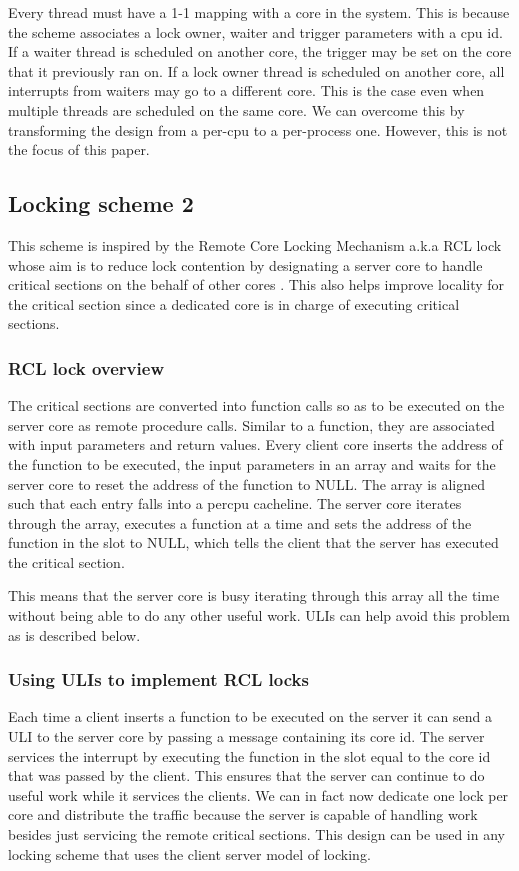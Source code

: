 Every thread must have a 1-1 mapping with a core in the system. This is because
the scheme associates a lock owner, waiter and trigger parameters with a cpu id.
If a waiter thread is scheduled on another core, the trigger may be set on the
core that it previously ran on. If a lock owner thread is scheduled on another
core, all interrupts from waiters may go to a different core. This is the case
even when multiple threads are scheduled on the same core. We can overcome this
by transforming the design from a per-cpu to a per-process one. However, this is
not the focus of this paper.

\subsection{Locking scheme 2}

This scheme is inspired by the Remote Core Locking Mechanism a.k.a RCL lock
whose aim is to reduce lock contention by designating a server core to handle
critical sections on the behalf of other cores \cite{lozi}. This also helps improve locality
for the critical section since a dedicated core is in charge of executing
critical sections. 

\subsubsection{RCL lock overview}

The critical sections are converted into function calls so as to be executed on
the server core as remote procedure calls. Similar to a function, they are
associated with input parameters and return values. Every client core inserts
the address of the function to be executed, the input parameters in an array and
waits for the server core to reset the address of the function to NULL. The
array is aligned such that each entry falls into a percpu cacheline. The server
core iterates through the array, executes a function at a time and sets the
address of the function in the slot to NULL, which tells the client that the
server has executed the critical section.

This means that the server core is busy iterating through this array all the
time without being able to do any other useful work. ULIs can help avoid this
problem as is described below.

\subsubsection{Using ULIs to implement RCL locks}

Each time a client inserts a function to be executed on the server it can send a
ULI to the server core by passing a message containing its core id. The server
services the interrupt by executing the function in the slot equal to the core
id that was passed by the client. This ensures that the server can continue to
do useful work while it services the clients. We can in fact now dedicate one
lock per core and distribute the traffic because the server is capable of
handling work besides just servicing the remote critical sections. This design
can be used in any locking scheme that uses the client server model of locking.
